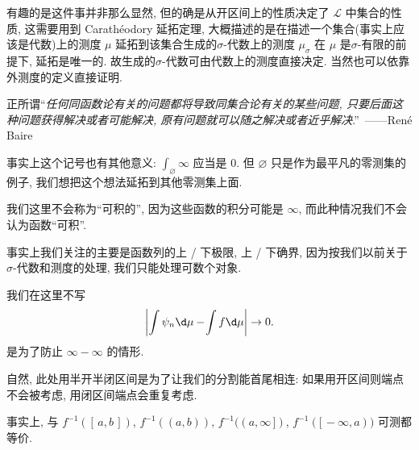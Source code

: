 \begin{alterendnote}
    有趣的是这件事并非那么显然, 但的确是从开区间上的性质决定了 $\mathcal L$ 中集合的性质, 这需要用到 Carathéodory 延拓定理, 大概描述的是在描述一个集合(事实上应该是代数)上的测度 $\mu $ 延拓到该集合生成的\;$\sigma $-代数上的测度 $\mu_{\sigma } $ 在 $\mu $ 是\;$\sigma $-有限的前提下, 延拓是唯一的. 故生成的\;$\sigma $-代数可由代数上的测度直接决定. 当然也可以依靠外测度的定义直接证明.
\end{alterendnote}
\begin{alterendnote}
    正所谓``\textit{任何同函数论有关的问题都将导致同集合论有关的某些问题, 只要后面这种问题获得解决或者可能解决, 原有问题就可以随之解决或者近乎解决}.''~------René Baire
\end{alterendnote}
\begin{alterendnote}
    事实上这个记号也有其他意义: $\int_\varnothing \infty$ 应当是 $0$. 但 $\varnothing$ 只是作为最平凡的零测集的例子, 我们想把这个想法延拓到其他零测集上面.
\end{alterendnote}
\begin{alterendnote}
    我们这里不会称为``可积的'', 因为这些函数的积分可能是 $\infty$, 而此种情况我们不会认为函数``可积''.
\end{alterendnote}
\begin{alterendnote}
    事实上我们关注的主要是函数列的上 / 下极限, 上 / 下确界, 因为按我们以前关于\;$\sigma $-代数和测度的处理, 我们只能处理可数个对象.
\end{alterendnote}
\begin{alterendnote}
    我们在这里不写\[\left| \int \psi _n\d \mu-\!\int f\d \mu  \right|\to 0. \]是为了防止 $\infty-\infty$ 的情形.
\end{alterendnote}
\begin{alterendnote}
    自然, 此处用半开半闭区间是为了让我们的分割能首尾相连: 如果用开区间则端点不会被考虑, 用闭区间端点会重复考虑.
\end{alterendnote}
\begin{alterendnote}
    事实上, 与 $f^{-1}([\,a,b\,])$, $f^{-1}((a,b))$, $f^{-1}((a,\infty\,])$, $f^{-1}([\,-\infty,a))$ 可测都等价.
\end{alterendnote}
